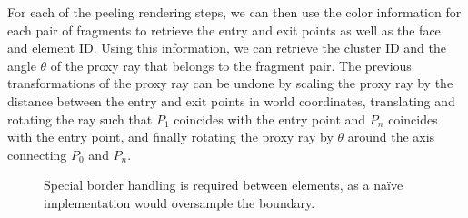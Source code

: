 For each of the peeling rendering steps, we can then use the color information for each pair of fragments to retrieve the entry and exit points as well as the face and element ID. Using this information, we can retrieve the cluster ID and the angle $\theta$ of the proxy ray that belongs to the fragment pair.  The previous transformations of the proxy ray can be undone by scaling the proxy ray by the distance between the entry and exit points in world coordinates, translating and rotating the ray such that $P_1$ coincides with the entry point and $P_n$ coincides with the entry point, and finally rotating the proxy ray by $\theta$ around the axis connecting $P_0$ and $P_n$.

\begin{figure}
\centering
{}
\caption{Special border handling is required between elements, as a na\"{i}ve implementation would oversample the boundary.}
\label{contributions:fem:overshoot}
\end{figure}


